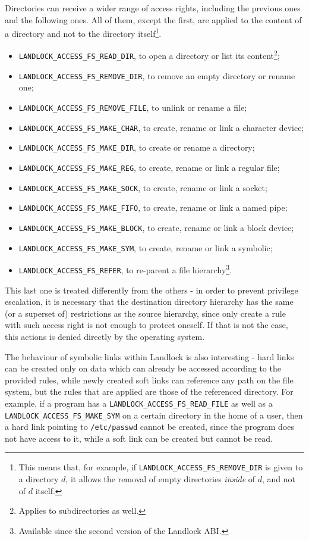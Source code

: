 Directories can receive a wider range of access rights, including the previous ones and the following ones.
All of them, except the first, are applied to the content of a directory and not to the directory
itself\footnote{This means that, for example, if \texttt{LANDLOCK\_ACCESS\_FS\_REMOVE\_DIR} is given to a directory $d$, it
allows the removal of empty directories \textit{inside} of $d$, and not of $d$ itself.}.
\begin{itemize}
  \item \texttt{LANDLOCK\_ACCESS\_FS\_READ\_DIR}, to open a directory or list its content\footnote{Applies to subdirectories as well.};
  \item \texttt{LANDLOCK\_ACCESS\_FS\_REMOVE\_DIR}, to remove an empty directory or rename one;
  \item \texttt{LANDLOCK\_ACCESS\_FS\_REMOVE\_FILE}, to unlink or rename a file;
  \item \texttt{LANDLOCK\_ACCESS\_FS\_MAKE\_CHAR}, to create, rename or link a character device;
  \item \texttt{LANDLOCK\_ACCESS\_FS\_MAKE\_DIR}, to create or rename a directory;
  \item \texttt{LANDLOCK\_ACCESS\_FS\_MAKE\_REG}, to create, rename or link a regular file;
  \item \texttt{LANDLOCK\_ACCESS\_FS\_MAKE\_SOCK}, to create, rename or link a socket;
  \item \texttt{LANDLOCK\_ACCESS\_FS\_MAKE\_FIFO}, to create, rename or link a named pipe;
  \item \texttt{LANDLOCK\_ACCESS\_FS\_MAKE\_BLOCK}, to create, rename or link a block device;
  \item \texttt{LANDLOCK\_ACCESS\_FS\_MAKE\_SYM}, to create, rename or link a symbolic;
  \item \texttt{LANDLOCK\_ACCESS\_FS\_REFER}, to re-parent a file hierarchy\footnote{Available since the second version of the Landlock ABI.}.
\end{itemize}

This last one is treated differently from the others - in order to prevent privilege escalation,
it is necessary that the destination directory hierarchy has the same (or a superset of) restrictions
as the source hierarchy, since only create a rule with such access right is not enough to protect oneself.
If that is not the case, this actions is denied directly by the operating system.

The behaviour of symbolic links within Landlock is also interesting - hard links can be created only on data
which can already be accessed according to the provided rules, while newly created soft links can reference any path on the
file system, but the rules that are applied are those of the referenced directory.
For example, if a program has a \texttt{LANDLOCK\_ACCESS\_FS\_READ\_FILE}  as well as a 
\texttt{LANDLOCK\_ACCESS\_FS\_MAKE\_SYM} on a certain directory in the home of a user, then a hard link
pointing to \texttt{/etc/passwd} cannot be created, since the program does not have access to it, while a soft
link can be created but cannot be read.

